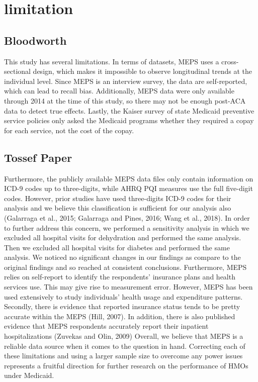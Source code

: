 \documentclass[../main.tex]{subfiles}
\begin{document}
\section{limitation}

\subsection{Bloodworth}
This study has several limitations. In terms of datasets, MEPS uses a cross-sectional design, which makes it impossible to observe longitudinal trends at the individual level. Since MEPS is an interview survey, the data are self-reported, which can lead to recall bias. Additionally, MEPS data were only available through 2014 at the time of this study, so there may not be enough post-ACA data to detect true effects. Lastly, the Kaiser survey of state Medicaid preventive service policies only asked the Medicaid programs whether they required a copay for each service, not the cost of the copay.

\subsection{ Tossef Paper}

Furthermore, the publicly available MEPS data files only contain information on ICD-9 codes up to three-digits, while AHRQ PQI measures use the full five-digit codes. However, prior studies have used three-digits ICD-9 codes for their analysis and we believe this classification is sufficient for our analysis also (Galarraga et al., 2015; Galarraga and Pines, 2016; Wang et al., 2018). In order to further address this concern, we performed a sensitivity analysis in which we excluded all hospital visits for dehydration and performed the same analysis. Then we excluded all hospital visits for diabetes and performed the same analysis. We noticed no significant changes in our findings as compare to the original findings and so reached at consistent conclusions. Furthermore, MEPS relies on self-report to identify the respondents' insurance plans and health services use. This may give rise to measurement error. However, MEPS has been used extensively to study individuals' health usage and expenditure patterns. Secondly, there is evidence that reported insurance status tends to be pretty accurate within the MEPS (Hill, 2007). In addition, there is also published evidence that MEPS respondents accurately report their inpatient hospitalizations (Zuvekas and Olin, 2009) Overall, we believe that MEPS is a reliable data source when it comes to the question in hand. Correcting each of these limitations and using a larger sample size to overcome any power issues represents a fruitful direction for further research on the performance of HMOs under Medicaid.
\end{document}

